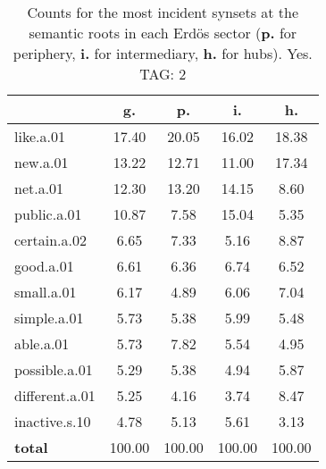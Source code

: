 \begin{table}[h!]
\begin{center}
\begin{tabular}{| l || c | c | c | c |}\hline
 & {\bf g.} & {\bf p.} & {\bf i.} & {\bf h.} \\\hline\hline
like.a.01 & 17.40  & 20.05  & 16.02  & 18.38 \\\hline
new.a.01 & 13.22  & 12.71  & 11.00  & 17.34 \\\hline
net.a.01 & 12.30  & 13.20  & 14.15  & 8.60 \\\hline
public.a.01 & 10.87  & 7.58  & 15.04  & 5.35 \\\hline
certain.a.02 & 6.65  & 7.33  & 5.16  & 8.87 \\\hline
good.a.01 & 6.61  & 6.36  & 6.74  & 6.52 \\\hline
small.a.01 & 6.17  & 4.89  & 6.06  & 7.04 \\\hline
simple.a.01 & 5.73  & 5.38  & 5.99  & 5.48 \\\hline
able.a.01 & 5.73  & 7.82  & 5.54  & 4.95 \\\hline
possible.a.01 & 5.29  & 5.38  & 4.94  & 5.87 \\\hline
different.a.01 & 5.25  & 4.16  & 3.74  & 8.47 \\\hline
inactive.s.10 & 4.78  & 5.13  & 5.61  & 3.13 \\\hline\hline
{{\bf total}} & 100.00  & 100.00  & 100.00  & 100.00 \\\hline
\end{tabular}
\caption{Counts for the most incident synsets at the semantic roots in each Erd\"os sector ({\bf p.} for periphery, {\bf i.} for intermediary, {\bf h.} for hubs). Yes. TAG: 2}
\end{center}
\end{table}
